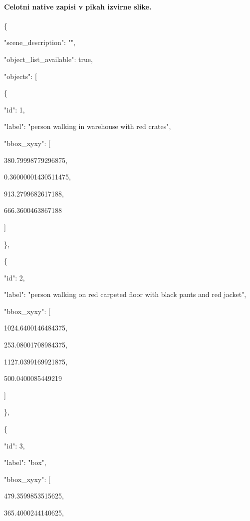 \documentclass[10pt,a4paper]{article}
\begin{document}
\paragraph{Celotni native zapisi v pikah izvirne slike.}
\{\par
  "scene\_description":\allowbreak{} "",\allowbreak{}\par
  "object\_list\_available":\allowbreak{} true,\allowbreak{}\par
  "objects":\allowbreak{} [\par
    \{\par
      "id":\allowbreak{} 1,\allowbreak{}\par
      "label":\allowbreak{} "person walking in warehouse with red crates",\allowbreak{}\par
      "bbox\_xyxy":\allowbreak{} [\par
        380.79998779296875,\allowbreak{}\par
        0.36000001430511475,\allowbreak{}\par
        913.2799682617188,\allowbreak{}\par
        666.3600463867188\par
      ]\par
    \},\allowbreak{}\par
    \{\par
      "id":\allowbreak{} 2,\allowbreak{}\par
      "label":\allowbreak{} "person walking on red carpeted floor with black pants and red jacket",\allowbreak{}\par
      "bbox\_xyxy":\allowbreak{} [\par
        1024.6400146484375,\allowbreak{}\par
        253.08001708984375,\allowbreak{}\par
        1127.0399169921875,\allowbreak{}\par
        500.0400085449219\par
      ]\par
    \},\allowbreak{}\par
    \{\par
      "id":\allowbreak{} 3,\allowbreak{}\par
      "label":\allowbreak{} "box",\allowbreak{}\par
      "bbox\_xyxy":\allowbreak{} [\par
        479.3599853515625,\allowbreak{}\par
        365.4000244140625,\allowbreak{}\par
\end{document}
